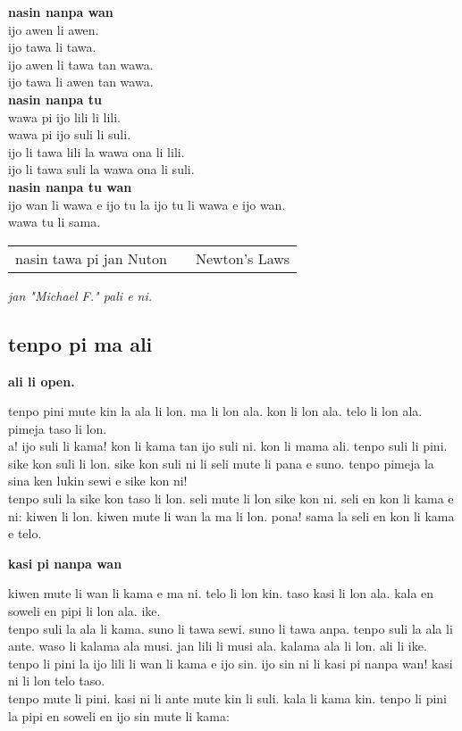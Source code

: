 \textbf{nasin nanpa wan}    \\
ijo awen li awen.    \\
ijo tawa li tawa.    \\
ijo awen li tawa tan wawa.    \\
ijo tawa li awen tan wawa.   \\
\textbf{nasin nanpa tu}    \\
wawa pi ijo lili li lili.    \\
wawa pi ijo suli li suli.    \\
ijo li tawa lili la wawa ona li lili.    \\
ijo li tawa suli la wawa ona li suli.       \\
\textbf{nasin nanpa tu wan}    \\
ijo wan li wawa e ijo tu la ijo tu li wawa e ijo wan.    \\
wawa tu li sama.

\begin{supertabular}{p{5,5cm}|ll}
    nasin tawa pi jan Nuton &  & Newton's Laws \\
\end{supertabular}

\textit{jan "Michael F."   pali e ni. \cite{www:failbluedot:01}}
%
\subsection{tenpo pi ma ali}

\textbf{ali li open.}

tenpo pini mute kin la ala li lon. ma li lon ala. kon li lon ala. telo li lon ala. pimeja taso li lon. \\
a! ijo suli li kama! kon li kama tan ijo suli ni. kon li mama ali. tenpo suli li pini. sike kon suli li lon. sike kon suli ni li seli mute li pana e suno. tenpo pimeja la sina ken lukin sewi e sike kon ni!  \\
tenpo suli la sike kon taso li lon. seli mute li lon sike kon ni. seli en kon li kama e ni: kiwen li lon. kiwen mute li wan la ma li lon. pona! sama la seli en kon li kama e telo.

\textbf{kasi pi nanpa wan}

kiwen mute li wan li kama e ma ni. telo li lon kin. taso kasi li lon ala. kala en soweli en pipi li lon ala. ike.  \\
tenpo suli la ala li kama. suno li tawa sewi. suno li tawa anpa. tenpo suli la ala li ante. waso li kalama ala musi. jan lili li musi ala. kalama ala li lon. ali li ike. tenpo li pini la ijo lili li wan li kama e ijo sin. ijo sin ni li kasi pi nanpa wan! kasi ni li lon telo taso.   \\
tenpo mute li pini. kasi ni li ante mute kin li suli. kala li kama kin. tenpo li pini la pipi en soweli en ijo sin mute li kama:

